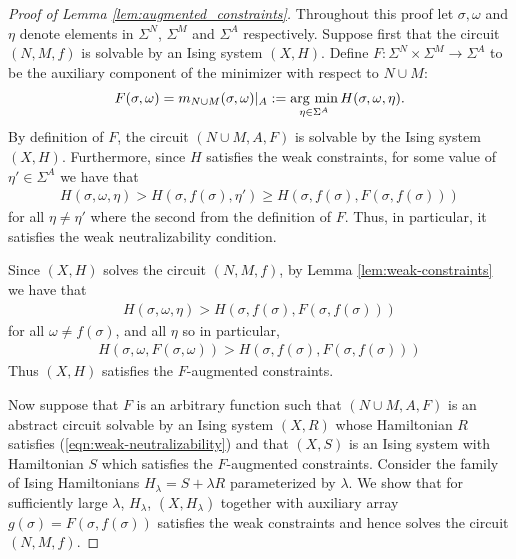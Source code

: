 \documentclass{article}
\begin{document}
\begin{proof}[Proof of Lemma \ref{lem:augmented_constraints}]
  Throughout this proof let $\sigma, \omega$ and $\eta$ denote elements in $\Sigma^N$, $\Sigma^M$ and $\Sigma^A$ respectively. Suppose first that the circuit $(N, M, f)$ is solvable by an Ising system $(X, H)$. Define $F:\Sigma^N\times \Sigma^M \to \Sigma^A$ to be the auxiliary component of the minimizer with respect to $N\cup M$:
  \begin{align*}
    F(\sigma, \omega) = m_{N\cup M}(\sigma, \omega)|_A := \operatorname*{arg ~ min}_{\eta\in \Sigma^A} H(\sigma, \omega, \eta).
  \end{align*}
  By definition of $F$, the circuit $(N\cup M, A, F)$ is solvable by the Ising system $(X, H)$. Furthermore, since $H$ satisfies the weak constraints, for some value of $\eta' \in \Sigma^A$ we have that
  \begin{align*}
    H(\sigma, \omega, \eta) > H(\sigma, f(\sigma), \eta') \geq H(\sigma, f(\sigma), F(\sigma, f(\sigma)))
  \end{align*}
  for all $\eta \neq \eta'$ where the second from the definition of $F$. Thus, in particular, it satisfies the weak neutralizability condition.

  Since $(X,H)$ solves the circuit $(N, M, f)$, by Lemma \ref{lem:weak-constraints} we have that
  \begin{align*}
    H(\sigma, \omega, \eta) > H(\sigma, f(\sigma), F(\sigma, f(\sigma)))
  \end{align*}
  for all $\omega \neq f(\sigma)$, and all $\eta$ so in particular,
  \begin{align*}
    H(\sigma, \omega, F(\sigma, \omega)) > H(\sigma, f(\sigma), F(\sigma, f(\sigma)))
  \end{align*}
  Thus $(X, H)$ satisfies the $F$-augmented constraints.

  \vspace{1.5em}

  Now suppose that $F$ is an arbitrary function such that $(N\cup M, A, F)$ is an abstract circuit solvable by an Ising system $(X, R)$ whose Hamiltonian $R$ satisfies (\ref{eqn:weak-neutralizability}) and that $(X,S)$ is an Ising system with Hamiltonian $S$ which satisfies the $F$-augmented constraints. Consider the family of Ising Hamiltonians $H_\lambda = S + \lambda R$ parameterized by $\lambda$. We show that for sufficiently large $\lambda$, $H_\lambda$, $(X,H_\lambda)$ together with auxiliary array $g(\sigma) = F(\sigma, f(\sigma))$ satisfies the weak constraints and hence solves the circuit $(N,M,f)$.


\end{proof}
\end{document}
